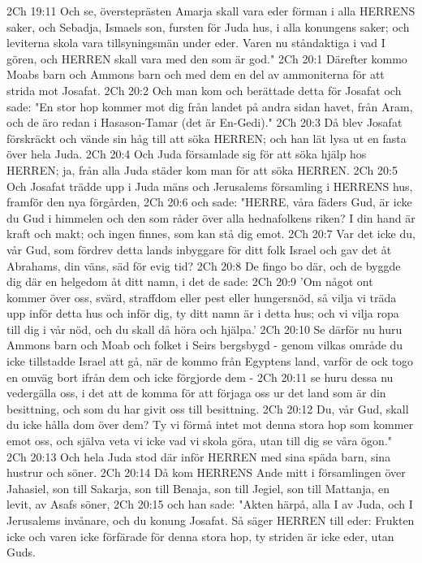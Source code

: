 2Ch 19:11  Och se, översteprästen Amarja skall vara eder förman i alla HERRENS saker, och Sebadja, Ismaels son, fursten för Juda hus, i alla konungens saker; och leviterna skola vara tillsyningsmän under eder. Varen nu ståndaktiga i vad I gören, och HERREN skall vara med den som är god."
2Ch 20:1  Därefter kommo Moabs barn och Ammons barn och med dem en del av ammoniterna för att strida mot Josafat.
2Ch 20:2  Och man kom och berättade detta för Josafat och sade: "En stor hop kommer mot dig från landet på andra sidan havet, från Aram, och de äro redan i Hasason-Tamar (det är En-Gedi)."
2Ch 20:3  Då blev Josafat förskräckt och vände sin håg till att söka HERREN; och han lät lysa ut en fasta över hela Juda.
2Ch 20:4  Och Juda församlade sig för att söka hjälp hos HERREN; ja, från alla Juda städer kom man för att söka HERREN.
2Ch 20:5  Och Josafat trädde upp i Juda mäns och Jerusalems församling i HERRENS hus, framför den nya förgården,
2Ch 20:6  och sade: "HERRE, våra fäders Gud, är icke du Gud i himmelen och den som råder över alla hednafolkens riken? I din hand är kraft och makt; och ingen finnes, som kan stå dig emot.
2Ch 20:7  Var det icke du, vår Gud, som fördrev detta lands inbyggare för ditt folk Israel och gav det åt Abrahams, din väns, säd för evig tid?
2Ch 20:8  De fingo bo där, och de byggde dig där en helgedom åt ditt namn, i det de sade:
2Ch 20:9  'Om något ont kommer över oss, svärd, straffdom eller pest eller hungersnöd, så vilja vi träda upp inför detta hus och inför dig, ty ditt namn är i detta hus; och vi vilja ropa till dig i vår nöd, och du skall då höra och hjälpa.'
2Ch 20:10  Se därför nu huru Ammons barn och Moab och folket i Seirs bergsbygd - genom vilkas område du icke tillstadde Israel att gå, när de kommo från Egyptens land, varför de ock togo en omväg bort ifrån dem och icke förgjorde dem -
2Ch 20:11  se huru dessa nu vedergälla oss, i det att de komma för att förjaga oss ur det land som är din besittning, och som du har givit oss till besittning.
2Ch 20:12  Du, vår Gud, skall du icke hålla dom över dem? Ty vi förmå intet mot denna stora hop som kommer emot oss, och själva veta vi icke vad vi skola göra, utan till dig se våra ögon."
2Ch 20:13  Och hela Juda stod där inför HERREN med sina späda barn, sina hustrur och söner.
2Ch 20:14  Då kom HERRENS Ande mitt i församlingen över Jahasiel, son till Sakarja, son till Benaja, son till Jegiel, son till Mattanja, en levit, av Asafs söner,
2Ch 20:15  och han sade: "Akten härpå, alla I av Juda, och I Jerusalems invånare, och du konung Josafat. Så säger HERREN till eder: Frukten icke och varen icke förfärade för denna stora hop, ty striden är icke eder, utan Guds.
